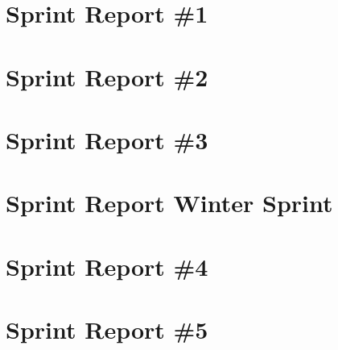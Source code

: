 

\section{Sprint Report \#1}



\section{Sprint Report \#2}



\section{Sprint Report \#3}



\section{Sprint Report Winter Sprint}



\section{Sprint Report \#4}



\section{Sprint Report \#5}


